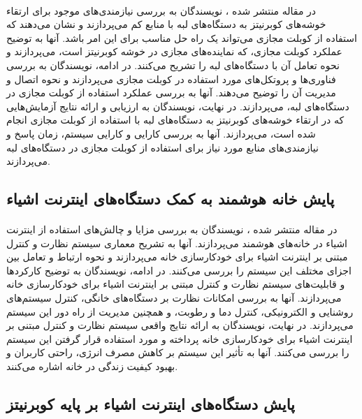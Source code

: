 \paragraph{}{
    در مقاله منتشر شده ،
    نویسندگان به بررسی نیازمندی‌های موجود برای ارتقاء خوشه‌های کوبرنیتز به دستگاه‌های لبه
    با منابع کم می‌پردازند و نشان می‌دهند که استفاده از کوبلت مجازی می‌تواند یک راه حل
    مناسب برای این امر باشد. آنها به توضیح عملکرد کوبلت مجازی، که نماینده‌های مجازی در
    خوشه کوبرنیتز است، می‌پردازند و نحوه تعامل آن با دستگاه‌های لبه را تشریح می‌کنند. در
    ادامه، نویسندگان به بررسی فناوری‌ها و پروتکل‌های مورد استفاده در کوبلت مجازی می‌پردازند
    و نحوه اتصال و مدیریت آن را توضیح می‌دهند. آنها به بررسی عملکرد استفاده از کوبلت مجازی 
    در دستگاه‌های لبه، می‌پردازند. در نهایت، نویسندگان به ارزیابی و ارائه نتایج آزمایش‌هایی
    که در ارتقاء خوشه‌های کوبرنیتز به دستگاه‌های لبه با استفاده از کوبلت مجازی انجام
    شده است، می‌پردازند. آنها به بررسی کارایی و کارایی سیستم، زمان پاسخ و نیازمندی‌های 
    منابع مورد نیاز برای استفاده از کوبلت مجازی در دستگاه‌های لبه می‌پردازند.
}

\subsection{
    پایش خانه هوشمند به کمک دستگاه‌های اینترنت اشیاء
}
\label{subsec:iot_based_monitoring}
\paragraph{}{
    در مقاله منتشر شده ،
    نویسندگان به بررسی مزایا و چالش‌های استفاده از اینترنت اشیاء در خانه‌های هوشمند می‌پردازند.
    آنها به تشریح معماری سیستم نظارت و کنترل مبتنی بر اینترنت اشیاء برای خودکارسازی خانه
    می‌پردازند و نحوه ارتباط و تعامل بین اجزای مختلف این سیستم را بررسی می‌کنند. در ادامه، 
    نویسندگان به توضیح کارکردها و قابلیت‌های سیستم نظارت و کنترل مبتنی بر اینترنت اشیاء برای
    خودکارسازی خانه می‌پردازند. آنها به بررسی امکانات نظارت بر دستگاه‌های خانگی، کنترل سیستم‌های 
    روشنایی و الکترونیکی، کنترل دما و رطوبت، و همچنین مدیریت از راه دور این سیستم می‌پردازند. 
    در نهایت، نویسندگان به ارائه نتایج واقعی سیستم نظارت و کنترل مبتنی بر اینترنت اشیاء برای 
    خودکارسازی خانه پرداخته و مورد استفاده قرار گرفتن این سیستم را بررسی می‌کنند. آنها به تأثیر
    این سیستم بر کاهش مصرف انرژی، راحتی کاربران و بهبود کیفیت زندگی در خانه اشاره می‌کنند.
}

\subsection{
    پایش دستگاه‌های اینترنت اشیاء بر پایه کوبرنیتز
}
\label{subsec:iot_device_management}
